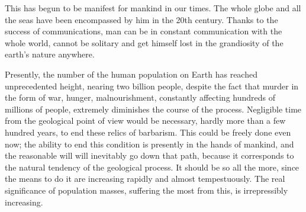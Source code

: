 This has begun to be manifest for mankind in our times.  The whole globe and
all the seas have been encompassed by him in the 20th century.  Thanks to the
success of communications, man can be in constant communication with the whole
world, cannot be solitary and get himself lost in the grandiosity of the
earth's nature anywhere.

Presently, the number of the human population on Earth has reached
unprecedented height, nearing two billion people, despite the fact that murder
in the form of war, hunger, malnourishment, constantly affecting hundreds of
millions of people, extremely diminishes the course of the process.
Negligible time from the geological point of view would be necessary, hardly
more than a few hundred years, to end these relics of barbarism.  This could
be freely done even now; the ability to end this condition is presently in the
hands of mankind, and the reasonable will will inevitably go down that path,
because it corresponds to the natural tendency of the geological process.  It
should be so all the more, since the means to do it are increasing rapidly and
almost tempestuously.  The real significance of population masses, suffering
the most from this, is irrepressibly increasing.

